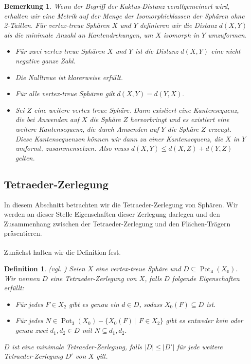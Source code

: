 \documentclass[12pt,titlepage,twoside,cleardoublepage]{article}
\theoremstyle{nummermitklammern}
\newtheorem{definition}[temp]{Definition}
\newtheorem{bemerkung}[temp]{Bemerkung}
\newtheorem{definition}[zahl]{Definition}
\newtheorem{bemerkung}[zahl]{Bemerkung}
\numberwithin{equation}{section}
\DeclareMathOperator{\Pot}{Pot}
\begin{document}
\begin{bemerkung}
Wenn der Begriff der Kaktus-Distanz verallgemeinert wird, erhalten wir eine Metrik auf der Menge der Isomorphieklassen der Sphären ohne 2-Taillen. Für vertex-treue Sphären $X$ und $Y$ definieren wir die Distanz $d(X,Y)$ als die minimale Anzahl an Kantendrehungen, um $X$ isomorph in $Y$ umzuformen. 
\begin{itemize}
\item Für zwei vertex-treue Sphären $X$ und $Y$ ist die Distanz $d(X,Y)$ eine nicht negative ganze Zahl.
\item Die Nulltreue ist klarerweise erfüllt.
\item Für alle vertex-treue Sphären gilt $d(X,Y)=d(Y,X).$
\item Sei $Z$ eine weitere vertex-treue Sphäre. Dann existiert eine Kantensequenz, die bei Anwenden auf $X$ die Sphäre $Z$ hervorbringt und es existiert eine weitere Kantensequenz, die durch Anwenden auf $Y$ die Sphäre $Z$ erzeugt. Diese Kantensequenzen können wir dann zu einer Kantensequenz, die $X$ in $Y$ umformt, zusammensetzen. Also muss $d(X,Y)\leq d(X,Z)+d(Y,Z)$ gelten.
\end{itemize}
\end{bemerkung}

\subsection{Tetraeder-Zerlegung}
In diesem Abschnitt betrachten wir die Tetraeder-Zerlegung von Sphären. Wir werden an dieser Stelle Eigenschaften dieser Zerlegung darlegen und den Zusammenhang zwischen der Tetraeder-Zerlegung und den Flächen-Trägern präsentieren.\\
\\
Zunächst halten wir die Definition fest. 
\begin{definition}{\textsc{(}vgl. \textsc{\cite{simp})}}
Seien $X$ eine vertex-treue Sphäre und $D\subseteq \Pot_4(X_0)$. Wir nennen $D$ eine \emph{Tetraeder-Zerlegung} von $X$, falls $D$ folgende Eigenschaften erfüllt:
\begin{itemize}
\item Für jedes $F\in X_2$ gibt es genau ein $d\in D$, sodass $X_0(F) \subseteq D$ ist.
\item Für jedes $N\in \Pot_3(X_0)-\{X_0(F)\mid F\in X_2\}$ gibt es entweder kein oder genau zwei $d_1,d_2\in D$ mit $N\subseteq d_1,d_2.$
\end{itemize}
$D$ ist eine minimale Tetraeder-Zerlegung, falls $\vert D \vert\leq \vert D' \vert$ für jede weitere Tetraeder-Zerlegung $D'$ von $X$ gilt.
\end{definition}
\end{document}
